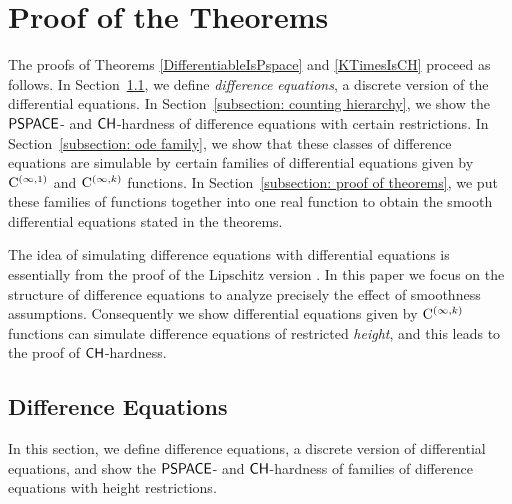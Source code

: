 \section{Proof of the Theorems}
\label{section:differentiable}

The proofs of Theorems \ref{DifferentiableIsPspace} and \ref{KTimesIsCH}
proceed as follows. 
In Section~\ref{section:divp}, 
we define \emph{difference equations}, 
a discrete version of the differential equations. 
In Section~\ref{subsection: counting hierarchy}, 
we show the $\mathsf{PSPACE}$- and $\mathsf{CH}$-hardness of 
difference equations with certain restrictions. 
In Section~\ref{subsection: ode family}, 
we show that these classes of difference equations are simulable 
by certain families of differential equations
given by $\mathrm C ^{(\infty, 1)}$ and $\mathrm C ^{(\infty, k)}$ functions. 
In Section~\ref{subsection: proof of theorems}, 
we put these families of functions together into one real function
to obtain the smooth differential equations stated in the theorems. 

The idea of simulating difference equations with differential equations
is essentially from the proof of 
the Lipschitz version \cite{kawamura2010lipschitz}.
In this paper we focus on the structure of difference equations
to analyze precisely the effect of smoothness assumptions.
Consequently we show differential equations 
given by $\mathrm C ^{(\infty, k)}$ functions
can simulate difference equations of restricted \emph{height}, 
and this leads to the proof of $\mathsf{CH}$-hardness.

\subsection{Difference Equations}
\label{section:divp}

In this section, we define difference equations, 
a discrete version of differential equations,
and show the $\mathsf{PSPACE}$- and $\mathsf{CH}$-hardness of 
families of difference equations with height restrictions. 

